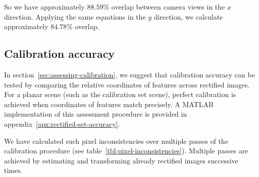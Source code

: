 \documentclass[../main.tex]{subfiles}
\begin{document}
So we have approximately $88.59\%$ overlap between camera views in the $x$ direction. Applying the same equations in the $y$ direction, we calculate approximately $84.78\%$ overlap.

\newpage
\subsection{Calibration accuracy} \label{sec:calibration-accuracy-result}
In section~\ref{sec:assessing-calibration}, we suggest that calibration accuracy can be tested by comparing the relative coordinates of features across rectified images. For a planar scene (such as the calibration set scene), perfect calibration is achieved when coordinates of features match precisely. A MATLAB implementation of this assessment procedure is provided in appendix~\ref{apx:rectified-set-accuracy}. 

We have calculated such pixel inconsistencies over multiple passes of the calibration procedure (see table~\ref{tbl:pixel-inconsistencies}). Multiple passes are achieved by estimating and transforming already rectified images successive times.
    
\end{document}

